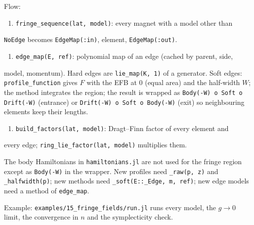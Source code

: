 \documentclass[11pt,a4paper]{article}
\begin{document}
Flow:

\begin{enumerate}
\item \texttt{fringe\_sequence(lat, model)}: every magnet with a model other than
\end{enumerate}
   \texttt{NoEdge} becomes \texttt{EdgeMap(:in)}, element, \texttt{EdgeMap(:out)}.
\begin{enumerate}
\item \texttt{edge\_map(E, ref)}: polynomial map of an edge (cached by parent, side,
\end{enumerate}
   model, momentum). Hard edges are \texttt{lie\_map(K, 1)} of a generator.
   Soft edges: \texttt{profile\_function} gives $F$ with the EFB at 0 (equal area)
   and the half-width $W$; the method integrates the region; the result
   is wrapped as \texttt{Body(-W) o Soft o Drift(-W)} (entrance) or
   \texttt{Drift(-W) o Soft o Body(-W)} (exit) so neighbouring elements keep
   their lengths.
\begin{enumerate}
\item \texttt{build\_factors(lat, model)}: Dragt–Finn factor of every element and
\end{enumerate}
   every edge; \texttt{ring\_lie\_factor(lat, model)} multiplies them.

The body Hamiltonians in \texttt{hamiltonians.jl} are not used for the fringe
region except as \texttt{Body(-W)} in the wrapper. New profiles need \texttt{\_raw(p, z)}
and \texttt{\_halfwidth(p)}; new methods need \texttt{\_soft(E::\_Edge, m, ref)}; new edge
models need a method of \texttt{edge\_map}.

Example: \texttt{examples/15\_fringe\_fields/run.jl} runs every model, the
$g\to 0$ limit, the convergence in $n$ and the symplecticity check.
\end{document}
